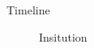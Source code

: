 \begin{frame}{Timeline}

\begin{figure}[t!] \centering
        
        \caption{\textcolor[RGB]{32,74,135}{Insitution}}
\end{figure}

\end{frame}
